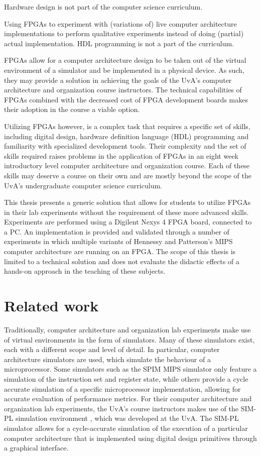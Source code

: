 \documentclass[openright]{uva-bachelor-thesis}
\begin{document}
Hardware design is not part of the computer science curriculum.

Using FPGAs to experiment with (variations of) live computer architecture implementations to perform qualitative experiments instead of doing (partial) actual implementation. HDL programming is not a part of the curriculum.

FPGAs allow for a computer architecture design to be taken out of the virtual environment of a simulator and be implemented in a physical device. As such, they may provide a solution in achieving the goals of the UvA's computer architecture and organization course instructors. The technical capabilities of FPGAs combined with the decreased cost of FPGA development boards makes their adoption in the course a viable option. 

Utilizing FPGAs however, is a complex task that requires a specific set of skills, including digital design, hardware definition language (HDL) programming and familiarity with specialized development tools. Their complexity and the set of skills required raises problems in the application of FPGAs in an eight week introductory level computer architecture and organization course. Each of these skills may deserve a course on their own and are mostly beyond the scope of the UvA's undergraduate computer science curriculum. 

This thesis presents a generic solution that allows for students to utilize FPGAs in their lab experiments without the requirement of these more advanced skills. Experiments are performed using a Digilent Nexys 4 FPGA board, connected to a PC. An implementation is provided and validated through a number of experiments in which multiple variants of Hennessy and Patterson's MIPS computer architecture are running on an FPGA. The scope of this thesis is limited to a technical solution and does not evaluate the didactic effects of a hands-on approach in the teaching of these subjects.

\section{Related work}
Traditionally, computer architecture and organization lab experiments make use of virtual environments in the form of simulators. Many of these simulators exist, each with a different scope and level of detail. In particular, computer architecture simulators are used, which simulate the behaviour of a microprocessor. Some simulators such as the SPIM MIPS simulator \cite{spim} only feature a simulation of the instruction set and register state, while others provide a cycle accurate simulation of a specific microprocessor implementation, allowing for accurate evaluation of performance metrics. For their computer architecture and organization lab experiments, the UvA's course instructors makes use of the SIM-PL simulation environment \cite{simpl}, which was developed at the UvA. The SIM-PL simulator allows for a cycle-accurate simulation of the execution of a particular computer architecture that is implemented using digital design primitives through a graphical interface.
\end{document}
